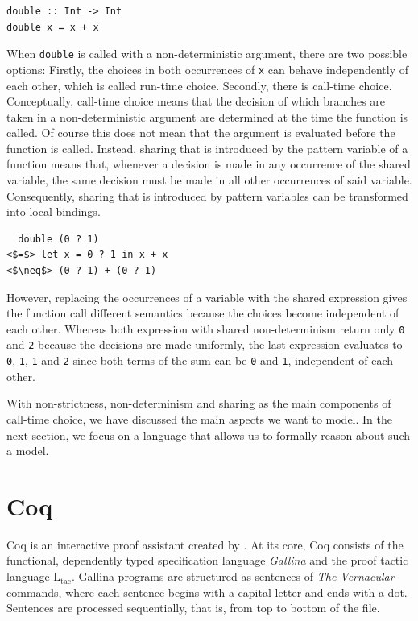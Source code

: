 \documentclass[a4paper, 11pt, fleqn, twoside, abstract=on]{scrreprt}
\newcommand{\hinl}[1]{\texttt{#1}}
\newcommand{\cinl}[1]{\texttt{#1}}
\begin{document}
\begin{verbatim}
double :: Int -> Int
double x = x + x
\end{verbatim}

When \hinl{double} is called with a non-deterministic argument, there are two possible options: Firstly, the choices in both occurrences of \hinl{x} can behave independently of each other, which is called run-time choice.
Secondly, there is call-time choice.
Conceptually, call-time choice means that the decision of which branches are taken in a non-deterministic argument are determined at the time the function is called.
Of course this does not mean that the argument is evaluated before the function is called.
Instead, sharing that is introduced by the pattern variable of a function means that, whenever a decision is made in any occurrence of the shared variable, the same decision must be made in all other occurrences of said variable.
Consequently, sharing that is introduced by pattern variables can be transformed into local bindings.

\begin{verbatim}
  double (0 ? 1) 
<$=$> let x = 0 ? 1 in x + x 
<$\neq$> (0 ? 1) + (0 ? 1)
\end{verbatim}

However, replacing the occurrences of a variable with the shared expression gives the function call different semantics because the choices become independent of each other.
Whereas both expression with shared non-determinism return only \hinl{0} and \hinl{2} because the decisions are made uniformly, the last expression evaluates to \hinl{0}, \hinl{1}, \hinl{1} and \cinl{2} since both terms of the sum can be \hinl{0} and \cinl{1}, independent of each other.

With non-strictness, non-determinism and sharing as the main components of call-time choice, we have discussed the main aspects we want to model.
In the next section, we focus on a language that allows us to formally reason about such a model.

\section{Coq}
\label{sec:coqIntro}

Coq is an interactive proof assistant created by \citet{coq2019}.
At its core, Coq consists of the functional, dependently typed specification language \textit{Gallina} and the proof tactic language L$_\text{tac}$.
Gallina programs are structured as sentences of \textit{The Vernacular} commands, where each sentence begins with a capital letter and ends with a dot.
Sentences are processed sequentially, that is, from top to bottom of the file.
\end{document}
